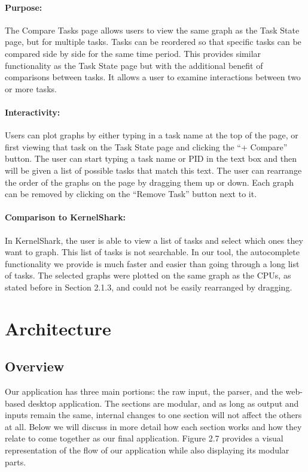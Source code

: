 \documentclass{hmcclinic}
\begin{document}
\paragraph{Purpose:}
The Compare Tasks page allows users to view the same graph as the Task State
page, but for multiple tasks. Tasks can be reordered so that specific tasks can
be compared side by side for the same time period. This provides similar
functionality as the Task State page but with the additional benefit of
comparisons between tasks. It allows a user to examine interactions between
two or more tasks. 

\paragraph{Interactivity:}
Users can plot graphs by either typing in a task name at the top of the page, or
first viewing that task on the Task State page and clicking the ``+ Compare''
button. The user can start typing a task name or PID in the text box and then
will be given a list of possible tasks that match this text. The user can
rearrange the order of the graphs on the page by dragging them up or down. Each
graph can be removed by clicking on the ``Remove Task'' button next to it.
    
\paragraph{Comparison to KernelShark:}
    In KernelShark, the user is able to view a list of tasks and select which
    ones they want to graph.  This list of tasks is not searchable. In our tool,
    the autocomplete functionality we provide is much faster and easier than
    going through a long list of tasks. The selected graphs were plotted on the
    same graph as the CPUs, as stated before in Section 2.1.3, and could not be
    easily rearranged by dragging.

\section{Architecture} %

  \subsection{Overview}

  Our application has three main portions: the raw input, the parser,
  and the web-based desktop application. The sections are modular, and
  as long as output and inputs remain the same, internal changes to one section will
  not affect the others at all. Below we will discuss in more detail how each
  section works and how they relate to come together as our final application.
  Figure 2.7 provides a visual representation of the flow of our application
  while also displaying its modular parts.
  
\end{document}
